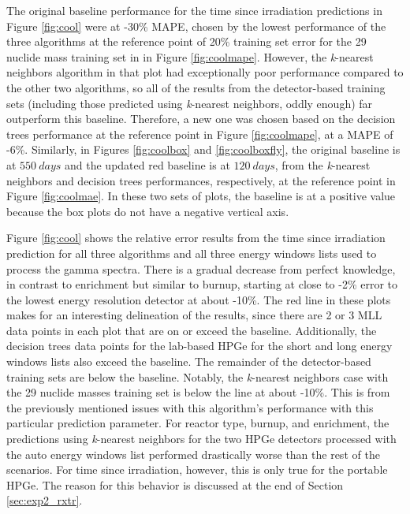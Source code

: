 The original baseline performance for the time since irradiation predictions in
Figure \ref{fig:cool} were at -30\% \gls{MAPE}, chosen by the lowest
performance of the three algorithms at the reference point of 20\% training set
error for the 29 nuclide mass training set in in Figure \ref{fig:coolmape}.
However, the \textit{k}-nearest neighbors algorithm in that plot had
exceptionally poor performance compared to the other two algorithms, so all of
the results from the detector-based training sets (including those predicted
using \textit{k}-nearest neighbors, oddly enough) far outperform this baseline.
Therefore, a new one was chosen based on the decision trees performance at the
reference point in Figure \ref{fig:coolmape}, at a \gls{MAPE} of -6\%.
Similarly, in Figures \ref{fig:coolbox} and \ref{fig:coolboxfly}, the original
baseline is at $550\:days$ and the updated red baseline is at $120\:days$, from
the \textit{k}-nearest neighbors and decision trees performances, respectively,
at the reference point in Figure \ref{fig:coolmae}.  In these two sets of
plots, the baseline is at a positive value because the box plots do not have a
negative vertical axis. 

Figure \ref{fig:cool} shows the relative error results from the time since
irradiation prediction for all three algorithms and all three energy windows
lists used to process the gamma spectra. There is a gradual decrease from
perfect knowledge, in contrast to enrichment but similar to burnup, starting at
close to -2\% error to the lowest energy resolution detector at about -10\%.
The red line in these plots makes for an interesting delineation of the
results, since there are 2 or 3 \gls{MLL} data points in each plot that are on
or exceed the baseline.  Additionally, the decision trees data points for the
lab-based \gls{HPGe} for the short and long energy windows lists also exceed
the baseline. The remainder of the detector-based training sets are below the
baseline.  Notably, the \textit{k}-nearest neighbors case with the 29 nuclide
masses training set is below the line at about -10\%.  This is from the
previously mentioned issues with this algorithm's performance with this
particular prediction parameter.  For reactor type, burnup, and enrichment, the
predictions using \textit{k}-nearest neighbors for the two \gls{HPGe} detectors
processed with the auto energy windows list performed drastically worse than
the rest of the scenarios. For time since irradiation, however, this is only
true for the portable \gls{HPGe}.  The reason for this behavior is discussed at
the end of Section \ref{sec:exp2_rxtr}. 


